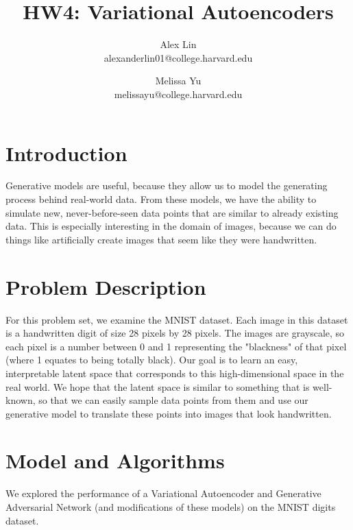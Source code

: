 \documentclass[11pt]{article}
\title{HW4: Variational Autoencoders}
\author{Alex Lin \\ alexanderlin01@college.harvard.edu \and Melissa Yu \\ melissayu@college.harvard.edu}
\begin{document}
\maketitle{}
\section{Introduction}
Generative models are useful, because they allow us to model the generating process behind real-world data.  From these models, we have the ability to simulate new, never-before-seen data points that are similar to already existing data.  This is especially interesting in the domain of images, because we can do things like artificially create images that seem like they were handwritten.  

\section{Problem Description}
For this problem set, we examine the MNIST dataset.  Each image in this dataset is a handwritten digit of size 28 pixels by 28 pixels.  The images are grayscale, so each pixel is a number between 0 and 1 representing the "blackness" of that pixel (where 1 equates to being totally black).  Our goal is to learn an easy, interpretable latent space that corresponds to this high-dimensional space in the real world.  We hope that the latent space is similar to something that is well-known, so that we can easily sample data points from them and use our generative model to translate these points into images that look handwritten.   

\section{Model and Algorithms}

We explored the performance of a Variational Autoencoder and Generative Adversarial Network (and modifications of these models) on the MNIST digits dataset.
\end{document}

